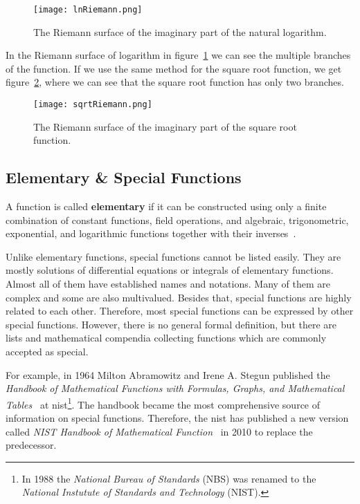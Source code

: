 \begin{figure}[!ht]
	\centering
	\texttt{[image: lnRiemann.png]}
	\caption{The Riemann surface of the imaginary part of the natural logarithm.}
	\label{fig:lnRiemann}
\end{figure}

In the Riemann surface of logarithm in figure~\ref{fig:lnRiemann} we can see the multiple branches of the function. If we use the same method for the square root function, we get figure~\ref{fig:sqrtRiemann}, where we can see that the square root function has only two branches.

\begin{figure}[!ht]
	\centering
	\texttt{[image: sqrtRiemann.png]}
	\caption{The Riemann surface of the imaginary part of the square root function.}
	\label{fig:sqrtRiemann}
\end{figure}

\subsection{Elementary \& Special Functions}\label{subsec:special-functions}
A function is called \textbf{elementary} if it can be constructed using only a finite combination of constant functions, field operations, and algebraic, trigonometric, exponential, and logarithmic functions together with their inverses~\cites{Elementary:1}[145]{Elementary:2}.

Unlike elementary functions, special functions cannot be listed easily. They are mostly solutions of differential equations or integrals of elementary functions. Almost all of them have established names and notations. Many of them are complex and some are also multivalued. Besides that, special functions are highly related to each other. Therefore, most special functions can be expressed by other special functions. However, there is no general formal definition, but there are lists and mathematical compendia collecting functions which are commonly accepted as special. 

For example, in 1964 Milton Abramowitz and Irene A. Stegun published the \textit{Handbook of Mathematical Functions with Formulas, Graphs, and Mathematical Tables}~\cite{AbramowitzStegun} at \gls{nist}\footnote{In 1988 the \textit{National Bureau of Standards} (NBS) was renamed to the \textit{National Instutute of Standards and Technology} (NIST).}. The handbook became the most comprehensive source of information on special functions. Therefore, the \gls{nist} has published a new version called \textit{NIST Handbook of Mathematical Function}~\cite{NIST:Handbook} in 2010 to replace the predecessor.

